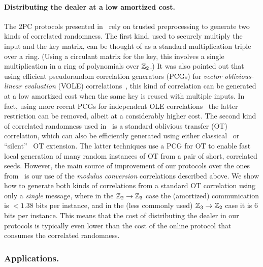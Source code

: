 
\paragraph{Distributing the dealer at a low amortized cost.} The 2PC protocols presented in~\cite{boneh2018-darkmatter} rely on trusted preprocessing to generate two kinds of correlated randomness. The first kind, used to securely multiply the input and the key matrix, can be thought of as a standard multiplication triple over a ring. (Using a circulant matrix for the key, this involves a single multiplication in a ring of polynomials over $\mathbb{Z}_2$.)  It was also pointed out that using efficient pseudorandom correlation generators (PCGs) for {\em vector oblivious-linear evaluation} (VOLE) correlations~\cite{BCGI18,BoyleetalCCS19,SchopmanetalCCS19}, this kind of correlation can be generated at a low amortized cost when the same key is reused with multiple inputs. In fact, using more recent PCGs for independent OLE correlations~\cite{PCGRingLPNCrypto20} the latter restriction can be removed, albeit at a considerably higher cost.  The second kind of correlated randomness used in~\cite{boneh2018-darkmatter} is a standard oblivious transfer (OT) correlation, which can also be efficiently generated using either classical~\cite{IKNP} or ``silent''~\cite{PCGCrypto19,BoyleetalCCS19,Ferret} OT extension. The latter techniques use a PCG for OT to enable fast local generation of many random instances of OT from a pair of short, correlated seeds.  
However, the main source of improvement of our protocols over the ones from~\cite{boneh2018-darkmatter}  is our use of the {\em modulus conversion} correlations described above. We show how to generate both kinds of correlations from a standard OT correlation using only a {\em single} message, where in the $\mathbb{Z}_2 \to \mathbb{Z}_3$ case the (amortized) communication is $<1.38$ bits per instance, and in the (less commonly used) $\mathbb{Z}_3 \to \mathbb{Z}_2$ case it is $6$ bits per instance. This means that the cost of distributing the dealer in our protocols is typically even lower than the cost of the online protocol that consumes the correlated randomness.


\subsubsection{Applications.}

